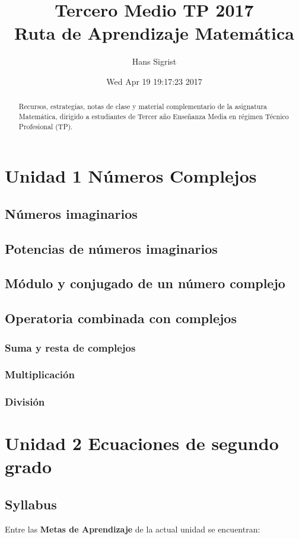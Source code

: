 \documentclass[12pt,letterpaper,article,x11names]{memoir}
\title{}
\author{Hans Sigrist}
\date{Wed Apr 19 19:17:23 2017}
\title{Tercero Medio TP 2017\\\medskip
\large Ruta de Aprendizaje Matemática}
\begin{document}
\maketitle
\begin{abstract}
Recursos, estrategias, notas de clase y material complementario de la asignatura Matemática, dirigido a estudiantes de Tercer año Enseñanza Media en régimen Técnico Profesional (TP).
\end{abstract}

\setcounter{tocdepth}{5}
\tableofcontents

\chapter{Unidad 1 Números Complejos}
\label{sec:org403c076}
\section{Números imaginarios}
\label{sec:org71e1ccc}
\section{Potencias de números imaginarios}
\label{sec:org880b18d}
\section{Módulo y conjugado de un número complejo}
\label{sec:orge06094b}
\section{Operatoria combinada con complejos}
\label{sec:org111626a}
\subsection{Suma y resta de complejos}
\label{sec:org0957ee3}
\subsection{Multiplicación}
\label{sec:org914041a}
\subsection{División}
\label{sec:org05b0c08}
\chapter{Unidad 2 Ecuaciones de segundo grado}
\label{sec:orgb298c09}
\section{Syllabus}
\label{sec:orgb53cc35}
Entre las \textbf{Metas de Aprendizaje} de la actual unidad se encuentran:
\end{document}
